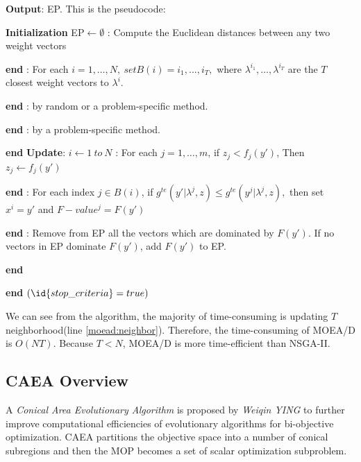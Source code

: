 \documentclass[a4paper, 11pt]{article}
\renewcommand{\End}{\kill\addtocounter{indent}{-1}\liprint\textbf{end} }
\begin{document}
\textbf{Output}: EP.
This is the pseudocode:
\begin{codebox}
\li \Comment \textbf{Initialization}
\li EP$\gets \emptyset$
\li {}:
\li \Do Compute the Euclidean distances
\li     between any two weight vectors
\li \End
\li
\li {}:
\li \Do For each $i=1,\ldots,N,\ set B(i)={i_1,\ldots,i_T},$
\li     where $\lambda^{i_1},\ldots,\lambda^{i_T}$ are the $T$ closest weight vectors to $\lambda^i$.
\li \End
\li
\li {}:
\li \Do by random or a problem-specific method.
\li \End
\li {}:
\li \Do by a problem-specific method.
\li \End
\li
\li \Comment \textbf{Update}:
\li \Repeat
\li     \For $i\gets1\ to\ N$
\li       \Do
\li           {}
\li           {}
\li           {}:
\li           \Do For each $j=1,\ldots,m$, if $z_j<f_j(y')$,
\li           Then $z_j \gets f_j(y')$
\li           \End
\li
\li           {}: \label{moead:neighbor}
\li           \Do For each index $j\in B(i)$,
\li           if $g^{te}(y'|\lambda^j,z)\le g^{te}(y^j|\lambda^j,z),$
\li           then set $x^i=y'$ and $F-value^j=F(y')$
\li           \End
\li           {}:
\li           \Do Remove from EP all the vectors
\li               which are dominated by $F(y')$.
\li               If no vectors in EP dominate $F(y')$,
\li               add $F(y')$ to EP.
\li            \End
\li       \End
\li \Until $(\id{stop\_criteria}=true)$
\end{codebox}
We can see from the algorithm, the majority of time-consuming is updating $T$ neighborhood(line \ref{moead:neighbor}). Therefore, the time-consuming of MOEA/D is $O(NT)$. Because $T<N$, MOEA/D is more time-efficient than NSGA-II.
\subsection{CAEA Overview}
A \emph{Conical Area Evolutionary Algorithm} is proposed by \emph{Weiqin YING} to further improve computational efficiencies of evolutionary algorithms for bi-objective optimization. CAEA partitions the objective space into a number of conical subregions and then the MOP becomes a set of scalar optimization subproblem.
\end{document}
